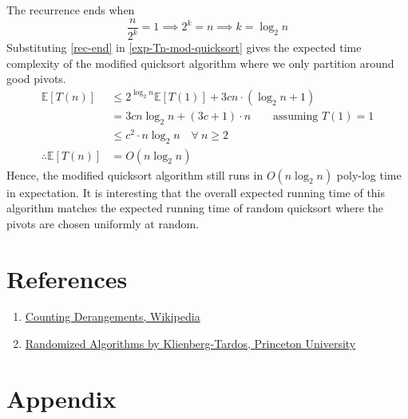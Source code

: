 \documentclass[9pt]{article}
\begin{document}
The recurrence ends when
\begin{equation}
    \label{rec-end}
    \frac{n}{2^{k}} = 1 \implies 2^{k} = n \implies k = \log_{2}{n}
\end{equation}
Substituting \eqref{rec-end} in \eqref{exp-Tn-mod-quicksort} gives the expected time complexity of the modified
quicksort algorithm where we only partition around good pivots.
\begin{equation}
    \label{exp-Tn-mod-quicksort-sol}
    \begin{split}
        \mathbb{E}[T(n)] &\leq 2^{\log_{2}{n}} \mathbb{E}[T(1)] + 3cn \cdot (\log_{2}{n} + 1) \\
        &= 3cn \log_{2}{n} + (3c + 1) \cdot n \qquad \text{assuming } T(1) = 1 \\
        &\leq c^{2} \cdot n \log_{2}{n} \quad \forall \ n \geq 2 \\
        \therefore \mathbb{E}[T(n)] &= O(n \log_{2}{n})
    \end{split}
\end{equation}
Hence, the modified quicksort algorithm still runs in $O(n \log_{2}{n})$ poly-log time in expectation. It is
interesting that the overall expected running time of this algorithm matches the expected running time of random
quicksort where the pivots are chosen uniformly at random.

\vfill
\section*{References}
\begin{enumerate}
    \item \href{https://en.wikipedia.org/wiki/Inclusion%E2%80%93exclusion_principle}{Counting Derangements, Wikipedia}
    \item \href{https://www.cs.princeton.edu/~wayne/kleinberg-tardos/pdf/13RandomizedAlgorithms.pdf}{Randomized Algorithms by Klienberg-Tardos, Princeton University}
\end{enumerate}

\pagebreak

\section*{\textbf{Appendix}}
\end{document}
